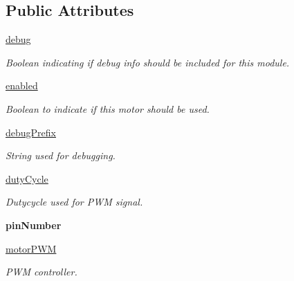 \subsection*{Public Attributes}
\begin{DoxyCompactItemize}
\item 
\mbox{\label{classMD30C_1_1MD30C_ac08d8380f43062eea5955910ab665813}} 
\hyperlink{classMD30C_1_1MD30C_ac08d8380f43062eea5955910ab665813}{debug}
\begin{DoxyCompactList}\small\item\em Boolean indicating if debug info should be included for this module. \end{DoxyCompactList}\item 
\hyperlink{classMD30C_1_1MD30C_a8f7dea57c9f54fc9e3235b22d3c01e56}{enabled}
\begin{DoxyCompactList}\small\item\em Boolean to indicate if this motor should be used. \end{DoxyCompactList}\item 
\mbox{\label{classMD30C_1_1MD30C_acd7b4ffc9c7a599c61c0c3447786ed91}} 
\hyperlink{classMD30C_1_1MD30C_acd7b4ffc9c7a599c61c0c3447786ed91}{debug\+Prefix}
\begin{DoxyCompactList}\small\item\em String used for debugging. \end{DoxyCompactList}\item 
\hyperlink{classMD30C_1_1MD30C_a967e0eb653d2ebb742863f77dd77ff1e}{duty\+Cycle}
\begin{DoxyCompactList}\small\item\em Dutycycle used for P\+WM signal. \end{DoxyCompactList}\item 
\mbox{\label{classMD30C_1_1MD30C_a38bf72444184835d585b6658f9669ce4}} 
{\bfseries pin\+Number}
\item 
\mbox{\label{classMD30C_1_1MD30C_a134f26ab282e5dedf8ebfab240bac1e2}} 
\hyperlink{classMD30C_1_1MD30C_a134f26ab282e5dedf8ebfab240bac1e2}{motor\+P\+WM}
\begin{DoxyCompactList}\small\item\em P\+WM controller. \end{DoxyCompactList}\end{DoxyCompactItemize}


